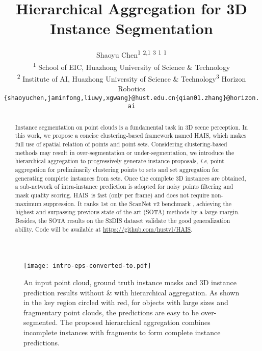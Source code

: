 \documentclass[10pt,twocolumn,letterpaper]{article}
\newcommand{\thename}{HAIS}
\def\ie{\emph{i.e}\onedot} \def\Ie{\emph{I.e}\onedot}
\begin{document}
\title{Hierarchical Aggregation for 3D Instance Segmentation}

\author{
{Shaoyu Chen}\textsuperscript{1} \textsuperscript{2,1} \textsuperscript{3} \textsuperscript{1} \textsuperscript{1}\\ 
\textsuperscript{1} School of EIC, Huazhong University of Science \& Technology \\
 \textsuperscript{2} Institute of AI, Huazhong University of Science \& Technology\quad \textsuperscript{3} Horizon Robotics\\

  {\tt\small \{shaoyuchen,jaminfong,liuwy,xgwang\}@hust.edu.cn\quad \{qian01.zhang\}@horizon.ai}
}







\maketitle


\begin{abstract}
Instance segmentation on point clouds is a fundamental task in 3D scene perception. In this work, we propose a concise clustering-based framework named \thename, which makes full use of spatial relation of points and point sets. Considering clustering-based methods may result in over-segmentation or under-segmentation, we introduce the hierarchical aggregation to progressively generate instance proposals, \ie, point aggregation for preliminarily clustering points to sets and set aggregation for generating complete instances from sets.
Once the complete 3D instances are obtained, a sub-network of intra-instance prediction is adopted for noisy points filtering and mask quality scoring. \thename\ is fast (only  per frame) and does not require non-maximum suppression. It ranks 1st on the ScanNet v2 benchmark
, 
achieving the highest   and surpassing previous state-of-the-art (SOTA) methods by a large margin. Besides, the SOTA results on the S3DIS dataset validate the good generalization ability.
Code will be available at \url{https://github.com/hustvl/HAIS}.
\end{abstract}




\begin{figure}[thbp]
    \centering
    \texttt{[image: intro-eps-converted-to.pdf]}
    \caption{An input point cloud, ground truth instance masks and 3D instance prediction results without \& with hierarchical aggregation. As shown in the key region circled with red, for objects with large sizes and fragmentary point clouds,
    the predictions are easy to be over-segmented. The proposed hierarchical aggregation combines incomplete instances with fragments to form complete instance predictions. }
    \label{fig:introduction} 
\end{figure}
\end{document}
